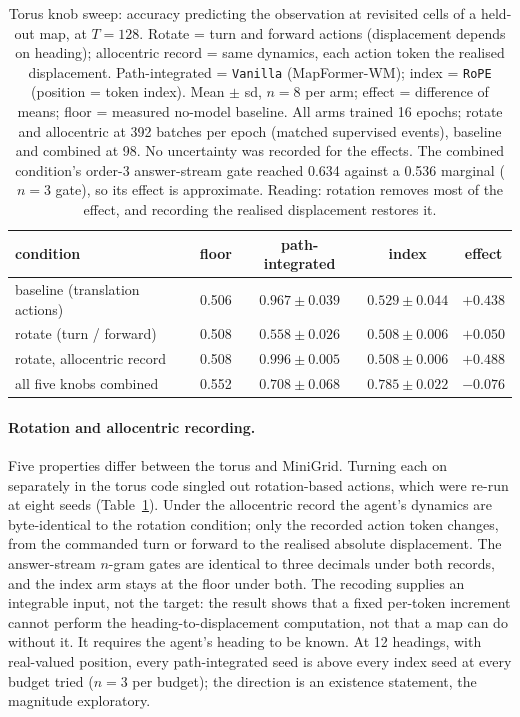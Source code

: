 \documentclass[10pt]{article}
\newcommand{\arm}[1]{\texttt{#1}}
\begin{document}
\begin{table}[t]
\centering
\small
\captionsetup{font=footnotesize,skip=4pt}
\caption{Torus knob sweep: accuracy predicting the observation at revisited cells of a held-out map, at $T=128$. Rotate = turn and forward actions (displacement depends on heading); allocentric record = same dynamics, each action token the realised displacement. Path-integrated = \arm{Vanilla} (MapFormer-WM); index = \arm{RoPE} (position = token index). Mean $\pm$ sd, $n=8$ per arm; effect = difference of means; floor = measured no-model baseline. All arms trained 16 epochs; rotate and allocentric at 392 batches per epoch (matched supervised events), baseline and combined at 98. No uncertainty was recorded for the effects. The combined condition's order-3 answer-stream gate reached 0.634 against a 0.536 marginal ($n=3$ gate), so its effect is approximate. Reading: rotation removes most of the effect, and recording the realised displacement restores it.}
\label{tab:knob}
\begin{tabular}{@{}lcccc@{}}
\toprule
condition & floor & path-integrated & index & effect \\
\midrule
baseline (translation actions)          & 0.506 & $0.967\pm0.039$ & $0.529\pm0.044$ & $+0.438$ \\
rotate (turn / forward)                 & 0.508 & $0.558\pm0.026$ & $0.508\pm0.006$ & $+0.050$ \\
rotate, allocentric record              & 0.508 & $0.996\pm0.005$ & $0.508\pm0.006$ & $+0.488$ \\
all five knobs combined                 & 0.552 & $0.708\pm0.068$ & $0.785\pm0.022$ & $-0.076$ \\
\bottomrule
\end{tabular}
\end{table}

\paragraph{Rotation and allocentric recording.} Five properties differ between the torus and MiniGrid. Turning
each on separately in the torus code singled out rotation-based actions, which were re-run at eight seeds
(Table~\ref{tab:knob}). Under the allocentric record the agent's dynamics are byte-identical to the rotation
condition; only the recorded action token changes, from the commanded turn or forward to the realised absolute
displacement. The answer-stream $n$-gram gates are identical to three decimals under both records, and the index
arm stays at the floor under both. The recoding supplies an integrable input, not the target: the result shows
that a fixed per-token increment cannot perform the heading-to-displacement computation, not that a map can do
without it. It requires the agent's heading to be known. At 12 headings, with real-valued position, every
path-integrated seed is above every index seed at every budget tried ($n=3$ per budget); the direction is an
existence statement, the magnitude exploratory.
\end{document}
